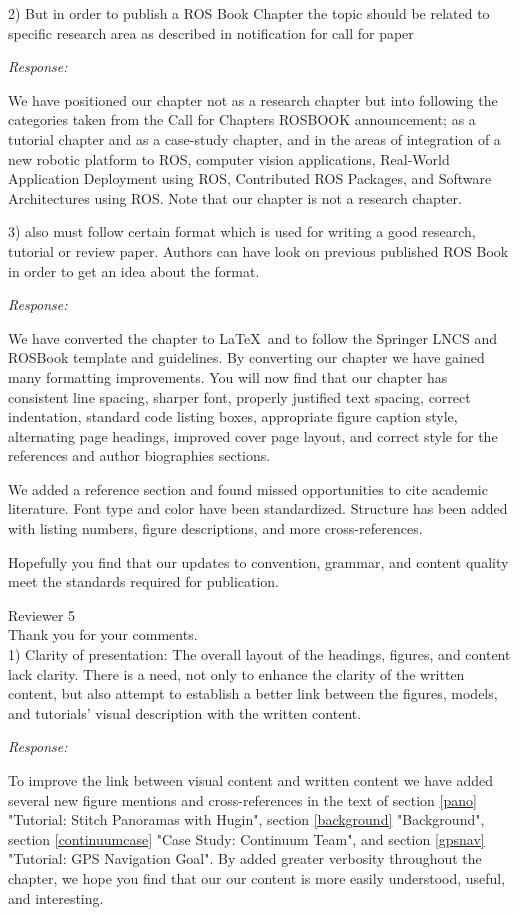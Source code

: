 \documentclass[runningheads,a4paper]{llncs}
\newcommand{\rsp}{\noindent \textit{Response:}}
\newcommand{\rev}[1]{
\newpage
\noindent Reviewer {#1}\\

\noindent Thank you for your comments.\\
}
\begin{document}
2)  But in order to publish a ROS Book Chapter the topic should be related to specific research area as described in notification for call for paper 

\rsp

We have positioned our chapter not as a research chapter but into following the categories taken from the Call for Chapters ROSBOOK announcement; as a tutorial chapter and as a case-study chapter, and in the areas of integration of a new robotic platform to ROS, computer vision applications, Real-World Application Deployment using ROS, Contributed ROS Packages, and Software Architectures using ROS. Note that our chapter is not a research chapter.

3)  also must follow certain format which is used for writing a good research, tutorial or review paper. Authors can have look on previous published ROS Book in order to get an idea about the format.

\rsp

We have converted the chapter to \LaTeX\  and to follow the Springer LNCS and ROSBook template and guidelines.  By converting our chapter we have gained many formatting improvements. You will now find that our chapter has consistent line spacing, sharper font, properly justified text spacing, correct indentation, standard code listing boxes, appropriate figure caption style, alternating page headings, improved cover page layout, and correct style for the references and author biographies sections.

We added a reference section and found missed opportunities to cite academic literature. Font type and color have been standardized. Structure has been added with listing numbers, figure descriptions, and more cross-references.

Hopefully you find that our updates to convention, grammar, and content quality meet the standards required for publication.

\rev{5}

1)  Clarity of presentation:  The overall layout of the headings, figures, and content lack clarity. There is a need, not only to enhance the clarity of the written content, but also attempt to establish a better link between the figures, models, and tutorials' visual description with the written content. 

\rsp

To improve the link between visual content and written content we have added several new figure mentions and cross-references in the text of section \ref{pano} "Tutorial: Stitch Panoramas with Hugin", section \ref{background} "Background", section \ref{continuumcase} "Case Study: Continuum Team", and section \ref{gpsnav} "Tutorial: GPS Navigation Goal".
By added greater verbosity throughout the chapter, we hope you find that our our content is more easily understood, useful, and interesting.
\end{document}
